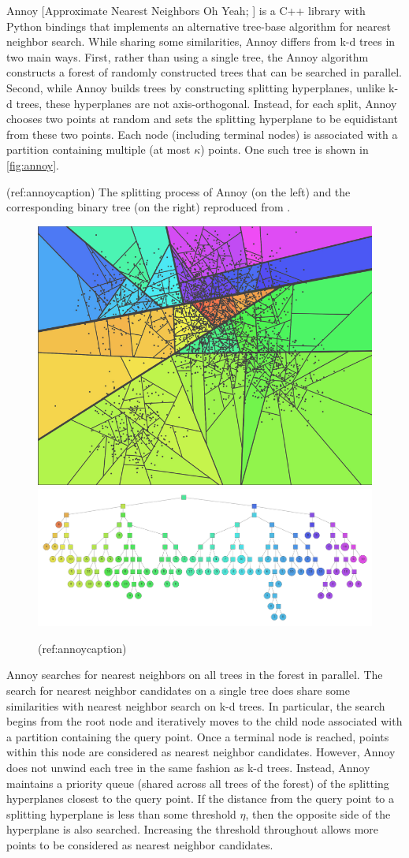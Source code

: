 \documentclass{article}
\begin{document}
Annoy {[}Approximate Nearest Neighbors Oh Yeah;
\citet{Bernhardsson2016-tf}{]} is a C++ library with Python bindings
that implements an alternative tree-base algorithm for nearest neighbor
search. While sharing some similarities, Annoy differs from k-d trees in
two main ways. First, rather than using a single tree, the Annoy
algorithm constructs a forest of randomly constructed trees that can be
searched in parallel. Second, while Annoy builds trees by constructing
splitting hyperplanes, unlike k-d trees, these hyperplanes are not
axis-orthogonal. Instead, for each split, Annoy chooses two points at
random and sets the splitting hyperplane to be equidistant from these
two points. Each node (including terminal nodes) is associated with a
partition containing multiple (at most \(\kappa\)) points. One such tree
is shown in \autoref{fig:annoy}.

(ref:annoycaption) The splitting process of Annoy (on the left) and the
corresponding binary tree (on the right) reproduced from
\citet{Bernhardsson2015-slides}.

\begin{figure}

{\centering \includegraphics[width=.49\linewidth]{figures/annoy1} \includegraphics[width=.49\linewidth]{figures/annoy2} 

}

\caption{(ref:annoycaption)}\label{fig:annoy}
\end{figure}

Annoy searches for nearest neighbors on all trees in the forest in
parallel. The search for nearest neighbor candidates on a single tree
does share some similarities with nearest neighbor search on k-d trees.
In particular, the search begins from the root node and iteratively
moves to the child node associated with a partition containing the query
point. Once a terminal node is reached, points within this node are
considered as nearest neighbor candidates. However, Annoy does not
unwind each tree in the same fashion as k-d trees. Instead, Annoy
maintains a priority queue (shared across all trees of the forest) of
the splitting hyperplanes closest to the query point. If the distance
from the query point to a splitting hyperplane is less than some
threshold \(\eta\), then the opposite side of the hyperplane is also
searched. Increasing the threshold throughout allows more points to be
considered as nearest neighbor candidates.
\end{document}
